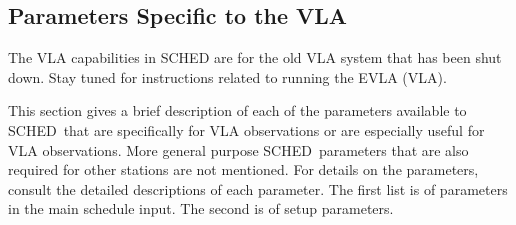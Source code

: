 \documentclass{report}
\newcommand{\schedb}{{\sc SCHED~}}
\begin{document}


\subsection{\label{SSEC:VLAPAR}Parameters Specific to the VLA}

The VLA capabilities in SCHED are for the old VLA system that has
been shut down.  Stay tuned for instructions related to running
the EVLA (VLA).

This section gives a brief description of each of the parameters
available to \schedb that are specifically for VLA observations or
are especially useful for VLA observations.  More general purpose
\schedb parameters that are also required for other stations are
not mentioned.  For details on the parameters, consult
the detailed descriptions of each parameter.  The first list
is of parameters in the main schedule input.  The second is of
setup parameters.
\end{document}
